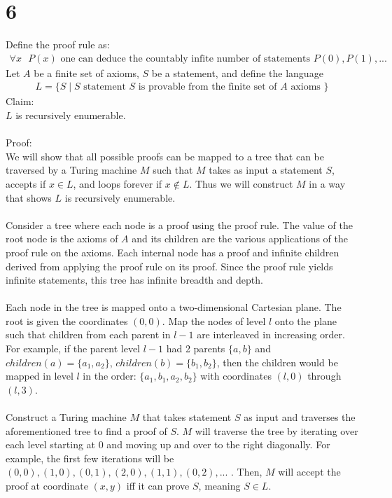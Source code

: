 \documentclass[letterpaper,notitlepage,twoside]{article}
\begin{document}
\section*{6}
Define the proof rule as:
\begin{align*}
\forall x \text{ } P(x) \text{ one can deduce the countably infite number of statements } P(0),P(1),...
\end{align*}
Let $A$ be a finite set of axioms, $S$ be a statement, and define the language
\begin{align*}
L = \lbrace S \mid S \text{ statement } S \text{ is provable from the finite set of } A \text { axioms }\rbrace
\end{align*}
Claim:
\\
$L$ is recursively enumerable.
\\
\\
Proof:
\\
We will show that all possible proofs can be mapped to a tree that can be traversed by a Turing machine $M$ such that $M$ takes as input a statement $S$, accepts if $x \in L$, and loops forever if $x \notin L$. Thus we will construct $M$ in a way that shows $L$ is recursively enumerable.
\\
\\
Consider a tree where each node is a proof using the proof rule. The value of the root node is the axioms of $A$ and its children are the various applications of the proof rule on the axioms. Each internal node has a proof and infinite children derived from applying the proof rule on its proof. Since the proof rule yields infinite statements, this tree has infinite breadth and depth.
\\
\\
Each node in the tree is mapped onto a two-dimensional Cartesian plane. The root is given the coordinates $\left( 0,0 \right)$. Map the nodes of level $l$ onto the plane such that children from each parent in $l-1$ are interleaved in increasing order. For example, if the parent level $l-1$ had 2 parents $\lbrace a,b \rbrace$ and $children(a)=\lbrace a_1,a_2 \rbrace$, $children(b)=\lbrace b_1,b_2 \rbrace$, then the children would be mapped in level $l$ in the order: $\lbrace a_1,b_1,a_2,b_2 \rbrace$ with coordinates $\left( l, 0 \right)$ through $\left( l,3 \right)$.
\\
\\
Construct a Turing machine $M$ that takes statement $S$ as input and traverses the aforementioned tree to find a proof of $S$. $M$ will traverse the tree by iterating over each level starting at 0 and moving up and over to the right diagonally. For example, the first few iterations will be $\left( 0,0 \right),\left( 1,0 \right),\left( 0,1 \right),\left( 2,0 \right),\left( 1,1 \right),\left( 0,2 \right),...$ . Then, $M$ will accept the proof at coordinate $\left( x,y \right)$ iff it can prove $S$, meaning $S \in L$.
\end{document}
